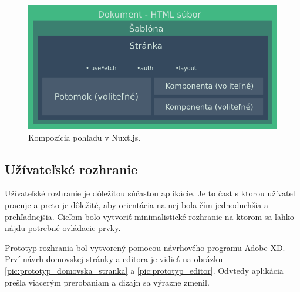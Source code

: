     \begin{figure}[!hbt]
        \centering
        \includegraphics[scale=0.5]{obrazky/nuxt_struktura.png}
        \caption{Kompozícia pohľadu v Nuxt.js.}
        \label{pic:nuxt_strukture}
    \end{figure}


\subsection{Užívateľské rozhranie}
Užívateľské rozhranie je dôležitou súčasťou aplikácie. Je to čast s ktorou užívateľ pracuje a preto je dôležité, aby orientácia na nej bola čím jednoduchšia a prehľadnejšia. Cieľom bolo vytvoriť minimalistické rozhranie na ktorom sa ľahko nájdu potrebné ovládacie prvky.

Prototyp rozhrania bol vytvorený pomocou návrhového programu Adobe XD. Prví návrh domovskej stránky a editora je vidieť na obrázku \ref{pic:prototyp_domovska_stranka} a \ref{pic:prototyp_editor}. Odvtedy aplikácia prešla viacerým prerobaniam a dizajn sa výrazne zmenil.

